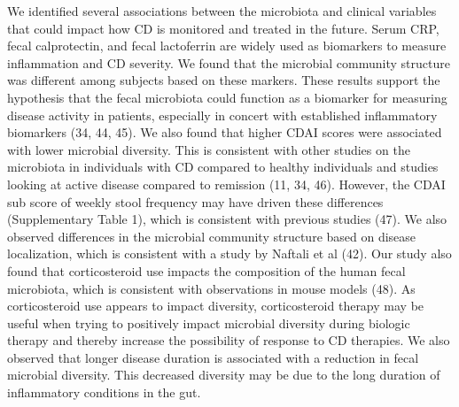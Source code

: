\documentclass[12pt,]{article}
\begin{document}
We identified several associations between the microbiota and clinical
variables that could impact how CD is monitored and treated in the
future. Serum CRP, fecal calprotectin, and fecal lactoferrin are widely
used as biomarkers to measure inflammation and CD severity. We found
that the microbial community structure was different among subjects
based on these markers. These results support the hypothesis that the
fecal microbiota could function as a biomarker for measuring disease
activity in patients, especially in concert with established
inflammatory biomarkers (34, 44, 45). We also found that higher CDAI
scores were associated with lower microbial diversity. This is
consistent with other studies on the microbiota in individuals with CD
compared to healthy individuals and studies looking at active disease
compared to remission (11, 34, 46). However, the CDAI sub score of
weekly stool frequency may have driven these differences (Supplementary
Table 1), which is consistent with previous studies (47). We also
observed differences in the microbial community structure based on
disease localization, which is consistent with a study by Naftali et al
(42). Our study also found that corticosteroid use impacts the
composition of the human fecal microbiota, which is consistent with
observations in mouse models (48). As corticosteroid use appears to
impact diversity, corticosteroid therapy may be useful when trying to
positively impact microbial diversity during biologic therapy and
thereby increase the possibility of response to CD therapies. We also
observed that longer disease duration is associated with a reduction in
fecal microbial diversity. This decreased diversity may be due to the
long duration of inflammatory conditions in the gut.
\end{document}
